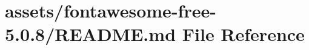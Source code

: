 \hypertarget{fontawesome-free-5_80_88_2_r_e_a_d_m_e_8md}{}\section{assets/fontawesome-\/free-\/5.0.8/\+R\+E\+A\+D\+ME.md File Reference}
\label{fontawesome-free-5_80_88_2_r_e_a_d_m_e_8md}
